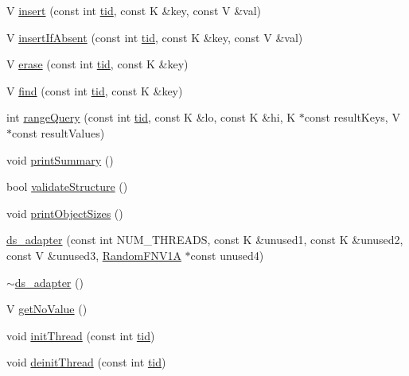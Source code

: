 \begin{DoxyCompactItemize}
\item 
V \hyperlink{classds__adapter_a6c0fc676d77e30e14946baf325174739}{insert} (const int \hyperlink{microbench_2main_8cpp_a9ca9869868fe7e7a38a921cc7de4103f}{tid}, const K \&key, const V \&val)
\item 
V \hyperlink{classds__adapter_ae9cb29ad0c0338c0e1d12ef97e008135}{insert\+If\+Absent} (const int \hyperlink{microbench_2main_8cpp_a9ca9869868fe7e7a38a921cc7de4103f}{tid}, const K \&key, const V \&val)
\item 
V \hyperlink{classds__adapter_a1bf459e8449df93cc738a644aeffdcfb}{erase} (const int \hyperlink{microbench_2main_8cpp_a9ca9869868fe7e7a38a921cc7de4103f}{tid}, const K \&key)
\item 
V \hyperlink{classds__adapter_a0109b0d011810f687c9e9273eb1d1bc8}{find} (const int \hyperlink{microbench_2main_8cpp_a9ca9869868fe7e7a38a921cc7de4103f}{tid}, const K \&key)
\item 
int \hyperlink{classds__adapter_a23a9c8db5425e98a93d647df1c6c23dd}{range\+Query} (const int \hyperlink{microbench_2main_8cpp_a9ca9869868fe7e7a38a921cc7de4103f}{tid}, const K \&lo, const K \&hi, K $\ast$const result\+Keys, V $\ast$const result\+Values)
\item 
void \hyperlink{classds__adapter_aac97293215557665d2ef1e1a0d06fcfd}{print\+Summary} ()
\item 
bool \hyperlink{classds__adapter_ae50fe8a8683c0278cdd4c45e1405860d}{validate\+Structure} ()
\item 
void \hyperlink{classds__adapter_a33b13b7059a8c0345fb59a324dc3a691}{print\+Object\+Sizes} ()
\item 
\hyperlink{classds__adapter_ab37964787a66459a325cf75ac91da4e8}{ds\+\_\+adapter} (const int N\+U\+M\+\_\+\+T\+H\+R\+E\+A\+DS, const K \&unused1, const K \&unused2, const V \&unused3, \hyperlink{classRandomFNV1A}{Random\+F\+N\+V1A} $\ast$const unused4)
\item 
\hyperlink{classds__adapter_a366f46dd39d59f2d4a147589f5fd98e3}{$\sim$ds\+\_\+adapter} ()
\item 
V \hyperlink{classds__adapter_a9e1e4aec136b351d1a6820d70484a6c5}{get\+No\+Value} ()
\item 
void \hyperlink{classds__adapter_a3733f6a6b57312b1b5e4fb5181d82a0b}{init\+Thread} (const int \hyperlink{microbench_2main_8cpp_a9ca9869868fe7e7a38a921cc7de4103f}{tid})
\item 
void \hyperlink{classds__adapter_a173ca48b19fc1dc346159ea582c690cd}{deinit\+Thread} (const int \hyperlink{microbench_2main_8cpp_a9ca9869868fe7e7a38a921cc7de4103f}{tid})

\end{DoxyCompactItemize}
